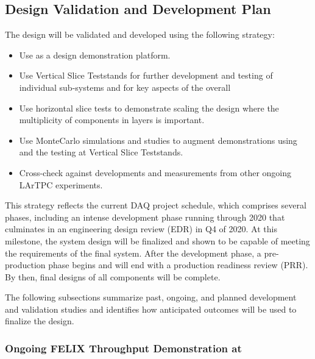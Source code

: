 \subsection{Design Validation and Development Plan}
\label{sec:sp-daq:design-validation}

The    design will be validated and developed using the following strategy:
\begin{itemize}
\item Use  as a design demonstration platform. 
\item Use Vertical Slice Teststands for further development and testing of
  individual  sub-systems and for key aspects of the
  overall 
\item Use horizontal slice tests to demonstrate scaling the design where the multiplicity of components in layers is important.
\item Use  MonteCarlo simulations and studies to augment
  demonstrations using  and the testing at Vertical Slice Teststands.
\item Cross-check against developments and measurements from other ongoing
  LArTPC experiments.
\end{itemize}

This strategy reflects the current DAQ project schedule, which
comprises several phases, including an intense development phase
running through 2020 that culminates in an engineering design
review (EDR) in Q4 of 2020. At this milestone, the system design will be
finalized and shown to be capable of meeting the requirements of the
final  system. After the development phase, a
pre-production phase begins and will end with a production readiness
review (PRR). By then, final designs of all components
will be complete.

The following subsections summarize past, ongoing, and planned
development and validation studies and identifies how anticipated outcomes
will be used to finalize the  design.

\subsubsection{Ongoing FELIX Throughput Demonstration at }
\label{sec:sp-daq:validation-pdune-felix}

